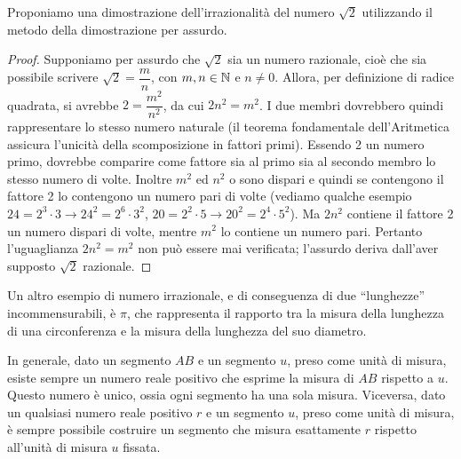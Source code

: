 \begin{enumerate}
Proponiamo una dimostrazione dell'irrazionalità del numero $\sqrt{2}$ utilizzando il metodo della dimostrazione per assurdo.


\begin{proof}
Supponiamo per assurdo che $\sqrt{2}$ sia un numero razionale, cioè che sia possibile scrivere $\sqrt{2}=\dfrac{m}{n}$, con $m,n \in \mathbb{N}$ e $n\neq 0$. Allora, per definizione di radice quadrata, si avrebbe $2=\dfrac{m^2}{n^2}$, da cui $2n^2=m^2$. I due membri dovrebbero quindi rappresentare lo stesso numero naturale (il teorema fondamentale dell'Aritmetica assicura l'unicità della scomposizione in fattori primi). Essendo 2 un numero primo, dovrebbe comparire come fattore sia al primo sia al secondo membro lo stesso numero di volte. Inoltre $m^2$ ed $n^2$ o sono dispari e quindi se contengono il fattore 2 lo contengono un numero pari di volte (vediamo qualche esempio $24=2^3\cdot3 \rightarrow 24^2=2^6\cdot3^2$, $20=2^2\cdot5 \rightarrow 20^2=2^4\cdot5^2$). Ma $2n^2$ contiene il fattore 2 un numero dispari di volte, mentre $m^2$ lo contiene un numero pari. Pertanto l'uguaglianza $2n^2=m^2$ non può essere mai verificata; l'assurdo deriva dall'aver supposto $\sqrt{2}$ razionale.
\end{proof}

Un altro esempio di numero irrazionale, e di conseguenza di due ``lunghezze'' incommensurabili, è $\pi$, che rappresenta il rapporto tra la misura della lunghezza di una circonferenza e la misura della lunghezza del suo diametro.
\end{enumerate}

In generale, dato un segmento $AB$ e un segmento $u$, preso come unità di misura, esiste sempre un numero reale positivo che esprime la misura di $AB$ rispetto a $u$. Questo numero è unico, ossia ogni segmento ha una sola misura. Viceversa, dato un qualsiasi numero reale positivo $r$ e un segmento $u$, preso come unità di misura, è sempre possibile costruire un segmento che misura esattamente $r$ rispetto all'unità di misura $u$ fissata.

